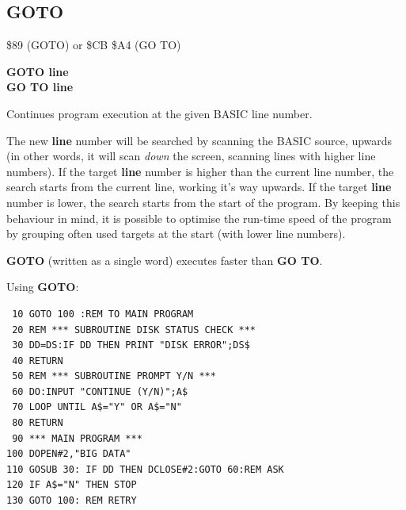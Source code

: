 
\newpage
\subsection{GOTO}
\begin{description}[leftmargin=2cm,style=nextline]
\item [Token:] \$89 (GOTO) or \$CB \$A4 (GO TO)
\item [Format:] {\bf GOTO line} \\
                {\bf GO TO line}
\item [Usage:] Continues program
               execution at the given BASIC line number.

\item [Remarks:] The new {\bf line} number will be searched by scanning
               the BASIC source, upwards (in other words, it will scan
               {\it down} the screen, scanning lines with higher line numbers).
               If the target {\bf line} number is higher than the current line number, the
               search starts from the current line, working it's way upwards.
               If the target {\bf line} number is lower, the search starts
               from the start of the program.
               By keeping this behaviour in mind, it is possible to optimise
               the run-time speed of the program by grouping often used targets at the
               start (with lower line numbers).

               {\bf GOTO} (written as a single
               word) executes faster than {\bf GO TO}.

\item [Example:] Using {\bf GOTO}:
\begin{tcolorbox}[colback=black,coltext=white]
\verbatimfont{\codefont}
\begin{verbatim}
 10 GOTO 100 :REM TO MAIN PROGRAM
 20 REM *** SUBROUTINE DISK STATUS CHECK ***
 30 DD=DS:IF DD THEN PRINT "DISK ERROR";DS$
 40 RETURN
 50 REM *** SUBROUTINE PROMPT Y/N ***
 60 DO:INPUT "CONTINUE (Y/N)";A$
 70 LOOP UNTIL A$="Y" OR A$="N"
 80 RETURN
 90 *** MAIN PROGRAM ***
100 DOPEN#2,"BIG DATA"
110 GOSUB 30: IF DD THEN DCLOSE#2:GOTO 60:REM ASK
120 IF A$="N" THEN STOP
130 GOTO 100: REM RETRY
\end{verbatim}
\end{tcolorbox}
\end{description}


